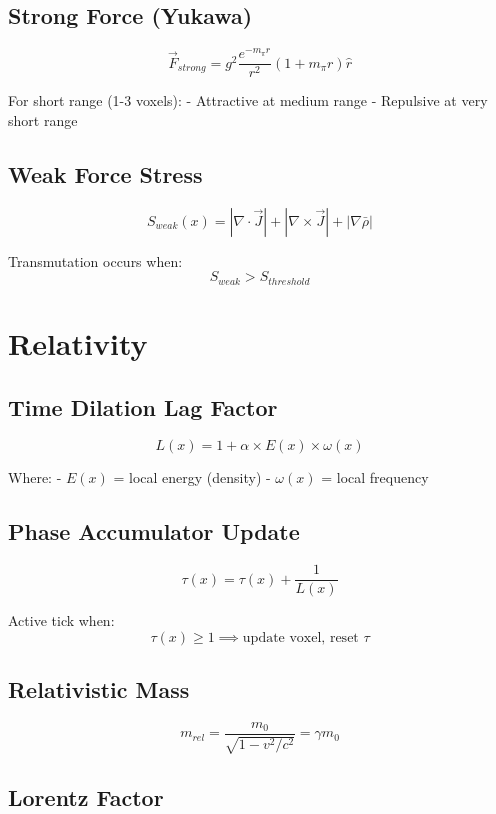 \documentclass[
  11pt,
  letterpaper,
  twoside,
  openright]{book}
\begin{document}
\subsection{Strong Force (Yukawa)}\label{strong-force-yukawa}

\[
\vec{F}_{strong} = g^2 \frac{e^{-m_\pi r}}{r^2}(1 + m_\pi r)\hat{r}
\]

For short range (1-3 voxels): - Attractive at medium range - Repulsive
at very short range

\subsection{Weak Force Stress}\label{weak-force-stress}

\[
S_{weak}(x) = |\nabla \cdot \vec{J}| + |\nabla \times \vec{J}| + |\nabla\bar{\rho}|
\]

Transmutation occurs when: \[
S_{weak} > S_{threshold}
\]

\section{Relativity}\label{relativity}

\subsection{Time Dilation Lag Factor}\label{time-dilation-lag-factor}

\[
L(x) = 1 + \alpha \times E(x) \times \omega(x)
\]

Where: - \(E(x)\) = local energy (density) - \(\omega(x)\) = local
frequency

\subsection{Phase Accumulator Update}\label{phase-accumulator-update}

\[
\tau(x) = \tau(x) + \frac{1}{L(x)}
\]

Active tick when: \[
\tau(x) \geq 1 \implies \text{update voxel, reset } \tau
\]

\subsection{Relativistic Mass}\label{relativistic-mass}

\[
m_{rel} = \frac{m_0}{\sqrt{1 - v^2/c^2}} = \gamma m_0
\]

\subsection{Lorentz Factor}\label{lorentz-factor}
\end{document}
